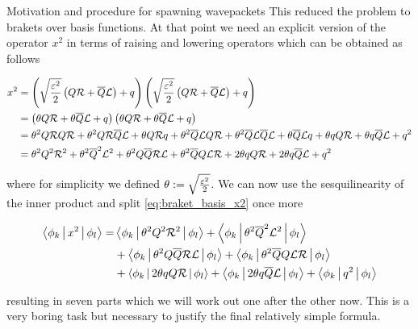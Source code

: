 \begin{chapter}{Motivation and procedure for spawning wavepackets}
This reduced the problem to brakets over basis functions. At that point we need an
explicit version of the operator $x^2$ in terms of raising and lowering operators
which can be obtained as follows

\begin{equation} \label{eq:def_operator_x2}
\begin{split}
  x^2 & = \left(\sqrt{\frac{\varepsilon^2}{2}} \left(Q \mathcal{R} + \overline{Q} \mathcal{L}\right) + q\right)
          \left(\sqrt{\frac{\varepsilon^2}{2}} \left(Q \mathcal{R} + \overline{Q} \mathcal{L}\right) + q\right) \\
      & = \left( \theta Q \mathcal{R} + \theta \overline{Q} \mathcal{L} + q\right)
          \left( \theta Q \mathcal{R} + \theta \overline{Q} \mathcal{L} + q\right) \\
      & = \theta^2 Q\mathcal{R}Q\mathcal{R} + \theta^2Q\mathcal{R}\overline{Q}\mathcal{L}
        + \theta Q\mathcal{R}q + \theta^2 \overline{Q}\mathcal{L}Q\mathcal{R} + \theta^2\overline{Q}\mathcal{L}\overline{Q}\mathcal{L}
        + \theta \overline{Q}\mathcal{L}q + \theta qQ\mathcal{R} + \theta q \overline{Q}\mathcal{L} + q^2 \\
      & = \theta^2 Q^2 \mathcal{R}^2 + \theta^2 \overline{Q}^2 \mathcal{L}^2
        + \theta^2 Q\overline{Q} \mathcal{RL} + \theta^2 \overline{Q}Q \mathcal{LR}
        + 2\theta q Q \mathcal{R} + 2\theta q\overline{Q} \mathcal{L} + q^2
\end{split}
\end{equation}

where for simplicity we defined $\theta := \sqrt{\frac{\varepsilon^2}{2}}$.
We can now use the sesquilinearity of the inner product and split \eqref{eq:braket_basis_x2}
once more

\begin{align*}
  \Braket{\phi_k | x^2 | \phi_l} = & 
  \Braket{\phi_k | \theta^2 Q^2 \mathcal{R}^2 | \phi_l}
  +\Braket{\phi_k | \theta^2 \overline{Q}^2 \mathcal{L}^2 | \phi_l} \\
  & +\Braket{\phi_k | \theta^2 Q\overline{Q} \mathcal{RL} | \phi_l}
  +\Braket{\phi_k | \theta^2 \overline{Q}Q \mathcal{LR} | \phi_l} \\
  & +\Braket{\phi_k | 2\theta q Q \mathcal{R} | \phi_l}
  +\Braket{\phi_k | 2\theta q\overline{Q} \mathcal{L} | \phi_l}
  +\Braket{\phi_k | q^2 | \phi_l}
\end{align*}

resulting in seven parts which we will work out one after the other now. This is
a very boring task but necessary to justify the final relatively simple formula.


\end{chapter}
